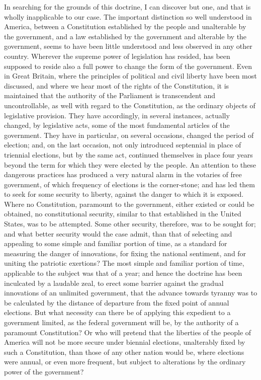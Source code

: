 In searching for the grounds of this doctrine, I can discover but one, and that is wholly inapplicable to our case. 
The important distinction so well understood in America, between a Constitution established by the people and unalterable by the government, and a law established by the government and alterable by the government, seems to have been little understood and less observed in any other country. 
Wherever the supreme power of legislation has resided, has been supposed to reside also a full power to change the form of the government. 
Even in Great Britain, where the principles of political and civil liberty have been most discussed, and where we hear most of the rights of the Constitution, it is maintained that the authority of the Parliament is transcendent and uncontrollable, as well with regard to the Constitution, as the ordinary objects of legislative provision. 
They have accordingly, in several instances, actually changed, by legislative acts, some of the most fundamental articles of the government. 
They have in particular, on several occasions, changed the period of election; and, on the last occasion, not only introduced septennial in place of triennial elections, but by the same act, continued themselves in place four years beyond the term for which they were elected by the people. 
An attention to these dangerous practices has produced a very natural alarm in the votaries of free government, of which frequency of elections is the corner-stone; and has led them to seek for some security to liberty, against the danger to which it is exposed. 
Where no Constitution, paramount to the government, either existed or could be obtained, no constitutional security, similar to that established in the United States, was to be attempted. 
Some other security, therefore, was to be sought for; and what better security would the case admit, than that of selecting and appealing to some simple and familiar portion of time, as a standard for measuring the danger of innovations, for fixing the national sentiment, and for uniting the patriotic exertions? 
The most simple and familiar portion of time, applicable to the subject was that of a year; and hence the doctrine has been inculcated by a laudable zeal, to erect some barrier against the gradual innovations of an unlimited government, that the advance towards tyranny was to be calculated by the distance of departure from the fixed point of annual elections. 
But what necessity can there be of applying this expedient to a government limited, as the federal government will be, by the authority of a paramount Constitution? 
Or who will pretend that the liberties of the people of America will not be more secure under biennial elections, unalterably fixed by such a Constitution, than those of any other nation would be, where elections were annual, or even more frequent, but subject to alterations by the ordinary power of the government?

